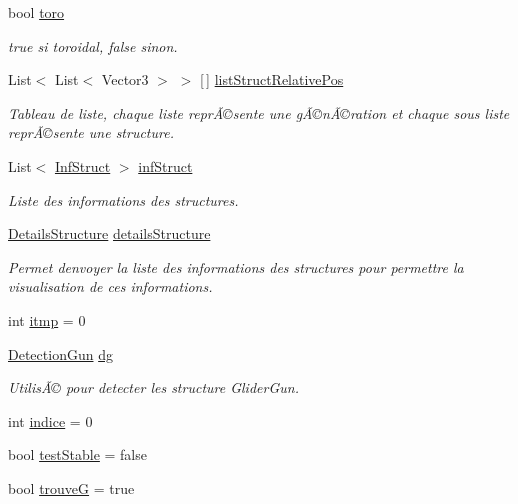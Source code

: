 \begin{DoxyCompactItemize}
bool \mbox{\hyperlink{class_detection_a2f87015f257584e33ceacc6d326fe5af}{toro}}
\begin{DoxyCompactList}\small\item\em true si toroidal, false sinon. \end{DoxyCompactList}\item 
List$<$ List$<$ Vector3 $>$ $>$ \mbox{[}$\,$\mbox{]} \mbox{\hyperlink{class_detection_a8fb631a5ff0dfc9604e0efb5662b98ad}{list\+Struct\+Relative\+Pos}}
\begin{DoxyCompactList}\small\item\em Tableau de liste, chaque liste reprÃ©sente une gÃ©nÃ©ration et chaque sous liste reprÃ©sente une structure. \end{DoxyCompactList}\item 
List$<$ \mbox{\hyperlink{class_inf_struct}{Inf\+Struct}} $>$ \mbox{\hyperlink{class_detection_a33e61516c561856189732c12d7182b1e}{inf\+Struct}}
\begin{DoxyCompactList}\small\item\em Liste des informations des structures. \end{DoxyCompactList}\item 
\mbox{\hyperlink{class_details_structure}{Details\+Structure}} \mbox{\hyperlink{class_detection_aa183bc717a4ba8c4371e319eb16fcd23}{details\+Structure}}
\begin{DoxyCompactList}\small\item\em Permet d\textquotesingle{}envoyer la liste des informations des structures pour permettre la visualisation de ces informations. \end{DoxyCompactList}\item 
int \mbox{\hyperlink{class_detection_a8b4cfe5136dffcd0f3196db073042fbe}{itmp}} = 0
\item 
\mbox{\hyperlink{class_detection_gun}{Detection\+Gun}} \mbox{\hyperlink{class_detection_a87f5c7e3ca25b83485fd648d0a512ae5}{dg}}
\begin{DoxyCompactList}\small\item\em UtilisÃ© pour detecter les structure Glider\+Gun. \end{DoxyCompactList}\item 
int \mbox{\hyperlink{class_detection_a530b494dd9b9cc7b028c1ba3334cab5f}{indice}} = 0
\item 
bool \mbox{\hyperlink{class_detection_a960ba0a4d4dce18672dd81aecb63a76c}{test\+Stable}} = false
\item 
bool \mbox{\hyperlink{class_detection_a0f5366777c01d08b01e83e11c1399224}{trouveG}} = true

\end{DoxyCompactItemize}
